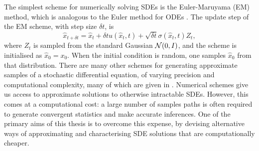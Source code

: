 The simplest scheme for numerically solving SDEs is the Euler-Maruyama (EM) method, which is analogous to the Euler method for ODEs \citep{KloedenPlaten_1992_NumericalSolutionStochastic}.
The update step of the EM scheme, with step size \(\delta t\), is
\begin{equation}
	\hat{x}_{t + \delta t} = \hat{x}_{t} + \delta t u\!\left(\hat{x}_t, t\right) + \sqrt{\delta t} \sigma\!\left(\hat{x}_t, t\right) Z_t,
	\label{eqn:em_step}
\end{equation}
where \(Z_t\) is sampled from the standard Gaussian \(\mathcal{N}\!\left(0,I\right)\), and the scheme is initialised as \(\hat{x}_0 = x_0\).
When the initial condition is random, one samples \(\hat{x}_0\) from that distribution.
There are many other schemes for generating approximate samples of a stochastic differential equation, of varying precision and computational complexity, many of which are given in \citet{KloedenPlaten_1992_NumericalSolutionStochastic}.
Numerical schemes give us access to approximate solutions to otherwise intractable SDEs.
However, this comes at a computational cost: a large number of samples paths is often required to generate convergent statistics and make accurate inferences.
One of the primary aims of this thesis is to overcome this expense, by devising alternative ways of approximating and characterising SDE solutions that are computationally cheaper.






